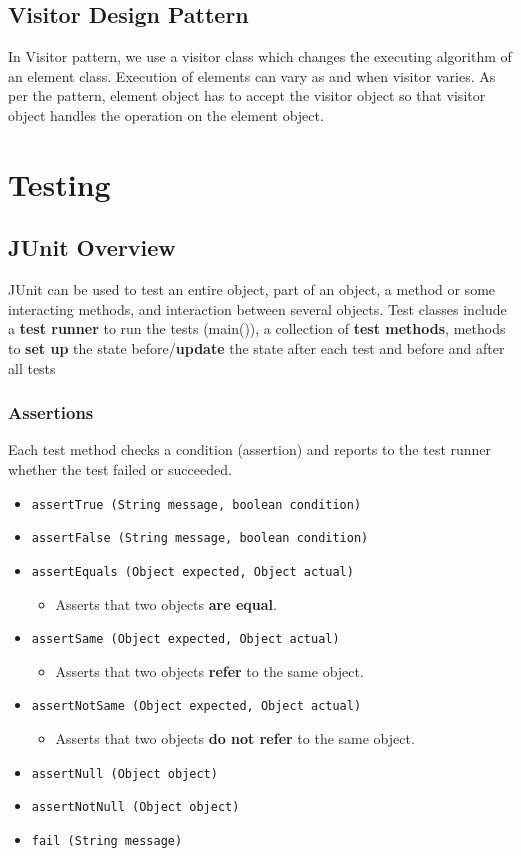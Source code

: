 \documentclass{article}
\begin{document}
\subsection{Visitor Design Pattern}
In Visitor pattern, we use a visitor class which changes the executing algorithm of an element class. Execution of elements can vary as and when visitor varies. As per the pattern, element object has to accept the visitor object so that visitor object handles the operation on the element object.

\break

\section{Testing}
\subsection{JUnit Overview}
JUnit can be used to test an entire object, part of an object, a method or some interacting methods, and interaction between several objects. Test classes include a \textbf{test runner} to run the tests (main()), a collection of \textbf{test methods}, methods to \textbf{set up} the state before/\textbf{update} the state after each test and before and after all tests
\subsubsection{Assertions}
Each test method checks a condition (assertion) and reports to the test runner whether the test failed or succeeded. 
\begin{itemize}
\item \lstinline{assertTrue (String message, boolean condition)}
\item \lstinline{assertFalse (String message, boolean condition)}
\item \lstinline{assertEquals (Object expected, Object actual)}
    \begin{itemize}
        \item Asserts that two objects \textbf{are equal}.
    \end{itemize}
\item \lstinline{assertSame (Object expected, Object actual)}
    \begin{itemize}
        \item Asserts that two objects \textbf{refer} to the same object.
    \end{itemize}
\item \lstinline{assertNotSame (Object expected, Object actual)}
    \begin{itemize}
        \item Asserts that two objects \textbf{do not refer} to the same object.
    \end{itemize}
\item \lstinline{assertNull (Object object)}
\item \lstinline{assertNotNull (Object object)}
\item \lstinline{fail (String message)}
\end{itemize}
\end{document}
